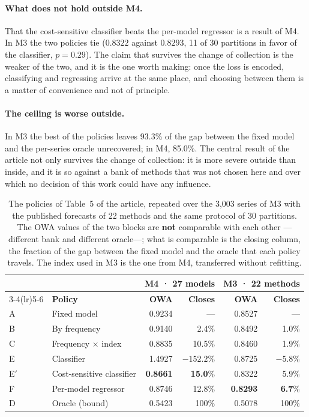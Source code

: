 \paragraph{What does not hold outside M4.} That the cost-sensitive classifier beats the
per-model regressor is a result of M4. In M3 the two policies tie ($0.8322$ against
$0.8293$, 11 of 30 partitions in favor of the classifier, $p=0.29$). The claim that
survives the change of collection is the weaker of the two, and it is the one worth
making: once the loss is encoded, classifying and regressing arrive at the same place,
and choosing between them is a matter of convenience and not of principle.

\paragraph{The ceiling is worse outside.} In M3 the best of the policies leaves 93.3\% of
the gap between the fixed model and the per-series oracle unrecovered; in M4, 85.0\%. The
central result of the article not only survives the change of collection: it is more
severe outside than inside, and it is so against a bank of methods that was not chosen
here and over which no decision of this work could have any influence.

\begin{table}[htbp]
\centering
\caption{The policies of Table~5 of the article, repeated over the 3,003 series of M3
with the published forecasts of 22 methods and the same protocol of 30 partitions. The
OWA values of the two blocks are \textbf{not} comparable with each other ---different
bank and different oracle---; what is comparable is the closing column, the fraction of
the gap between the fixed model and the oracle that each policy travels. The index used
in M3 is the one from M4, transferred without refitting.}
\label{tab:m3}
\begin{tabular}{llrrrr}
\toprule
& & \multicolumn{2}{c}{\textbf{M4} · 27 models}
  & \multicolumn{2}{c}{\textbf{M3} · 22 methods} \\
\cmidrule(lr){3-4}\cmidrule(lr){5-6}
& \textbf{Policy} & \textbf{OWA} & \textbf{Closes} & \textbf{OWA} & \textbf{Closes} \\
\midrule
A & Fixed model & 0.9234 & --- & 0.8527 & --- \\
B & By frequency & 0.9140 & 2.4\% & 0.8492 & 1.0\% \\
C & Frequency $\times$ index & 0.8835 & 10.5\% & 0.8460 & 1.9\% \\
E & Classifier & 1.4927 & $-152.2$\% & 0.8725 & $-5.8$\% \\
E$'$ & Cost-sensitive classifier & \textbf{0.8661} & \textbf{15.0}\% & 0.8322 & 5.9\% \\
F & Per-model regressor & 0.8746 & 12.8\% & \textbf{0.8293} & \textbf{6.7}\% \\
D & Oracle (bound) & 0.5423 & 100\% & 0.5078 & 100\% \\
\bottomrule
\end{tabular}
\end{table}

